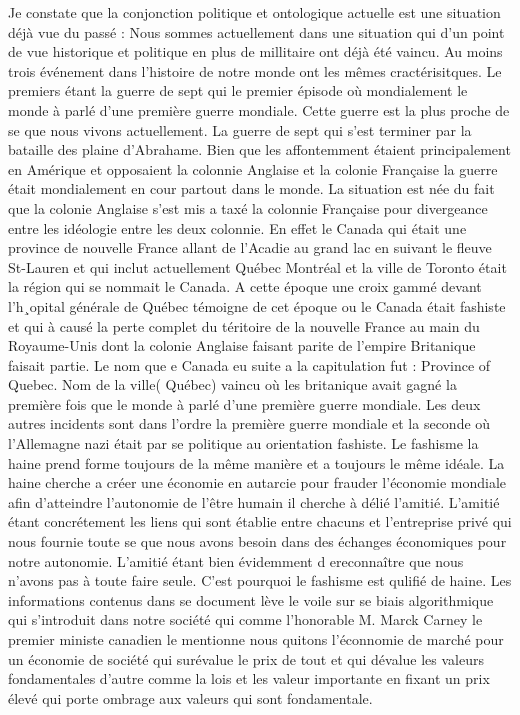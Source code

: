 \documentclass[12pt,letterpaper,oneside]{article}
\begin{document}
Je constate que la conjonction politique et ontologique actuelle est une situation déjà vue du passé : Nous sommes actuellement dans une situation qui d'un point de vue historique et politique en plus de millitaire ont déjà été vaincu. Au moins trois événement dans l'histoire de notre monde ont les mêmes cractérisitques. Le premiers étant la guerre de sept qui le premier épisode où mondialement le monde à parlé d'une première guerre mondiale. Cette guerre est la plus proche de se que nous vivons actuellement. La guerre de sept qui s'est terminer par la bataille des plaine d'Abrahame. Bien que les affontemment étaient principalement en Amérique et opposaient la colonnie Anglaise et la colonie Française la guerre était mondialement en cour partout dans le monde. La situation est née du fait que la colonie Anglaise s'est mis a taxé la colonnie Française pour divergeance entre les idéologie entre les deux colonnie. En effet le Canada qui était une province de nouvelle France allant de l'Acadie au grand lac en suivant le fleuve St-Lauren et qui inclut actuellement Québec Montréal et la ville de Toronto était la région qui se nommait le Canada. A cette époque une croix gammé devant l'h¸opital générale de Québec témoigne de cet époque ou le Canada était fashiste et qui à causé la perte complet du téritoire de la nouvelle France au main du Royaume-Unis dont la colonie Anglaise faisant parite de l'empire Britanique faisait partie. Le nom que e Canada eu suite a la capitulation fut : Province of Quebec. Nom de la ville( Québec) vaincu où les britanique avait gagné la première fois que le monde à parlé d'une première guerre mondiale. Les deux autres incidents sont dans l'ordre la première guerre mondiale et la seconde où l'Allemagne nazi était par se politique au orientation fashiste. Le fashisme la haine prend forme toujours de la même manière et a toujours le même idéale. La haine cherche a créer une économie en autarcie pour frauder l'économie mondiale afin d'atteindre l'autonomie de l'être humain il cherche à délié l'amitié. L'amitié étant concrétement les liens qui sont établie entre chacuns et l'entreprise privé qui nous fournie toute se que nous avons besoin dans des échanges économiques pour notre autonomie. L'amitié étant bien évidemment d ereconnaître que nous n'avons pas à toute faire seule. C'est pourquoi le fashisme est qulifié de haine. Les informations contenus dans se document lève le voile sur se biais algorithmique qui s'introduit dans notre société qui comme l'honorable M. Marck Carney le premier ministe canadien 
le mentionne nous quitons l'éconnomie de marché pour un économie de société qui surévalue le prix de tout et qui dévalue les valeurs fondamentales d'autre comme la lois et les valeur importante en fixant un prix élevé qui porte ombrage aux valeurs qui sont fondamentale.
\end{document}
